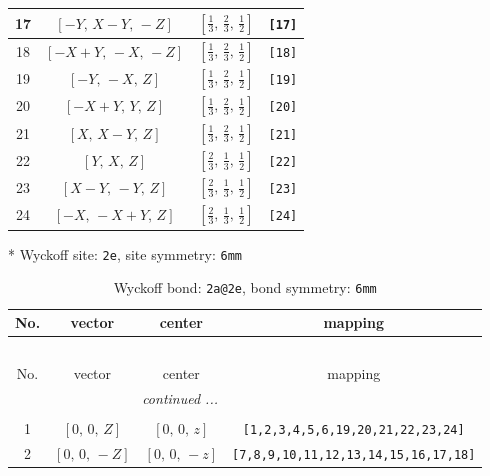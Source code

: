 \documentclass[fleqn,8pt]{jsarticle}
\begin{document}
\begin{longtable}{cccc}
17 & $\left[ - Y,\, X - Y,\, - Z \right]$ & $\left[ \frac{1}{3},\, \frac{2}{3},\, \frac{1}{2} \right]$ & {\tt [17]} \\ \hline
18 & $\left[ - X + Y,\, - X,\, - Z \right]$ & $\left[ \frac{1}{3},\, \frac{2}{3},\, \frac{1}{2} \right]$ & {\tt [18]} \\ \hline
19 & $\left[ - Y,\, - X,\, Z \right]$ & $\left[ \frac{1}{3},\, \frac{2}{3},\, \frac{1}{2} \right]$ & {\tt [19]} \\ \hline
20 & $\left[ - X + Y,\, Y,\, Z \right]$ & $\left[ \frac{1}{3},\, \frac{2}{3},\, \frac{1}{2} \right]$ & {\tt [20]} \\ \hline
21 & $\left[ X,\, X - Y,\, Z \right]$ & $\left[ \frac{1}{3},\, \frac{2}{3},\, \frac{1}{2} \right]$ & {\tt [21]} \\ \hline
22 & $\left[ Y,\, X,\, Z \right]$ & $\left[ \frac{2}{3},\, \frac{1}{3},\, \frac{1}{2} \right]$ & {\tt [22]} \\ \hline
23 & $\left[ X - Y,\, - Y,\, Z \right]$ & $\left[ \frac{2}{3},\, \frac{1}{3},\, \frac{1}{2} \right]$ & {\tt [23]} \\ \hline
24 & $\left[ - X,\, - X + Y,\, Z \right]$ & $\left[ \frac{2}{3},\, \frac{1}{3},\, \frac{1}{2} \right]$ & {\tt [24]} \\
\end{longtable}
* Wyckoff site: {\tt 2e}, site symmetry: {\tt 6mm}
\renewcommand{\arraystretch}{1.2}
\begin{longtable}{cccc}
\caption{Wyckoff bond: {\tt 2a@2e}, bond symmetry: {\tt 6mm}}
 \\
 \hline \hline
No. & vector & center & mapping \\ \hline \endfirsthead

\multicolumn{3}{l}{\tablename\ \thetable{}} \\
 \hline \hline
No. & vector & center & mapping \\ \hline \endhead

 \hline \hline
\multicolumn{3}{r}{\footnotesize\it continued ...} \\ \endfoot

 \hline \hline
\multicolumn{3}{r}{} \\ \endlastfoot

1 & $\left[ 0,\, 0,\, Z \right]$ & $\left[ 0,\, 0,\, z \right]$ & {\tt [1,2,3,4,5,6,19,20,21,22,23,24]} \\ \hline
2 & $\left[ 0,\, 0,\, - Z \right]$ & $\left[ 0,\, 0,\, - z \right]$ & {\tt [7,8,9,10,11,12,13,14,15,16,17,18]} \\
\end{longtable}
\end{document}
